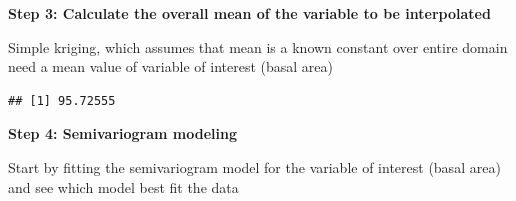 \documentclass[
]{book}
\newenvironment{Shaded}{\begin{snugshade}}{\end{snugshade}}
\newcommand{\FunctionTok}[1]{\textcolor[rgb]{0.00,0.00,0.00}{#1}}
\newcommand{\NormalTok}[1]{#1}
\newcommand{\OtherTok}[1]{\textcolor[rgb]{0.56,0.35,0.01}{#1}}
\newcommand{\SpecialCharTok}[1]{\textcolor[rgb]{0.00,0.00,0.00}{#1}}
\begin{document}
\textbf{Step 3: Calculate the overall mean of the variable to be interpolated }

Simple kriging, which assumes that mean is a known constant over entire domain need a mean value of variable of interest (basal area)

\begin{Shaded}
\end{Shaded}

\begin{verbatim}
## [1] 95.72555
\end{verbatim}

\textbf{Step 4: Semivariogram modeling}

Start by fitting the semivariogram model for the variable of interest (basal area) and see which model best fit the data
\end{document}
